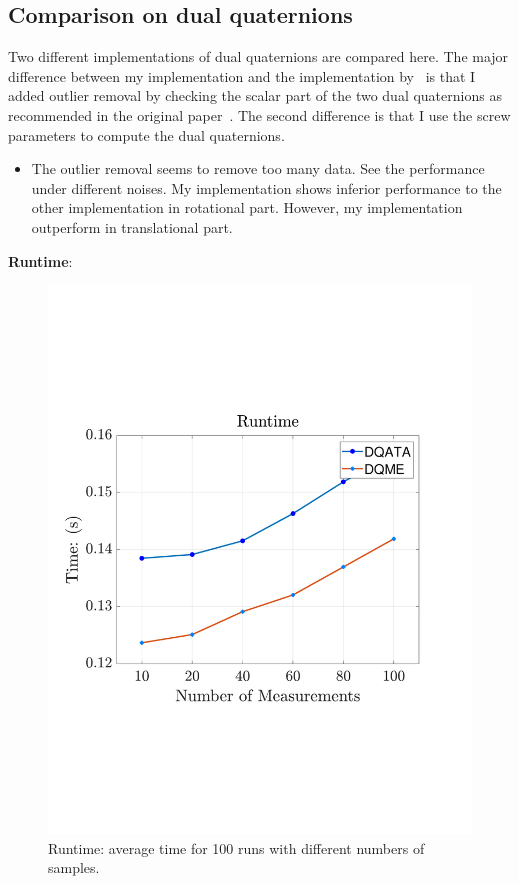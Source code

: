 \documentclass[a4paper]{report}
\begin{document}
\subsection{Comparison on dual quaternions}
Two different implementations of dual quaternions are compared here. The major difference between my implementation and the implementation by~\cite{pachtrachai2018adjoint} is that I added outlier removal by checking the scalar part of the two dual quaternions as recommended in the original paper~\cite{daniilidis1999hand}. The second difference is that I use the screw parameters to compute the dual quaternions.
\begin{itemize}
	\item The outlier removal seems to remove too many data. See the performance under different noises. My implementation shows inferior performance to the other implementation in rotational part. However, my implementation outperform in translational part.
\end{itemize}


\textbf{Runtime}:
\begin{figure}
\centering
\includegraphics[scale=0.4]{./hand_eye_figures/dq/dq_runtime_cmp}
\caption{Runtime: average time for 100 runs with different numbers of samples.}
\end{figure}
\end{document}
